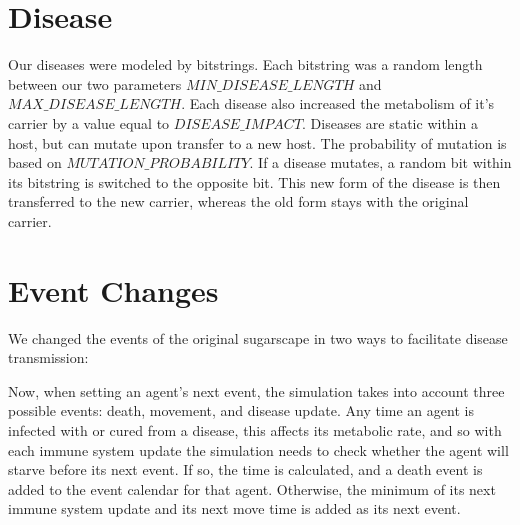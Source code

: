 \documentclass[12pt,a4paper]{article} %
\begin{document}
    \section{Disease}
    Our diseases were modeled by bitstrings. Each bitstring was a random length between our two parameters $MIN\_DISEASE\_LENGTH$ and $MAX\_DISEASE\_LENGTH$. Each disease also increased the metabolism of it's carrier by a value equal to $DISEASE\_IMPACT$. Diseases are static within a host, but can mutate upon transfer to a new host. The probability of mutation is based on $MUTATION\_PROBABILITY$. If a disease mutates, a random bit within its bitstring is switched to the opposite bit. This new form of the disease is then transferred to the new carrier, whereas the old form stays with the original carrier.
    
    \section{Event Changes}
    
    We changed the events of the original sugarscape in two ways to facilitate disease transmission:
    
    
    Now, when setting an agent's next event, the simulation takes into account three possible events: death, movement,
    and disease update. Any time an agent is infected with or cured from a disease, this affects its metabolic rate,
    and so with each immune system update the simulation needs to check whether the agent will starve before its
    next event. If so, the time is calculated, and a death event is added to the event calendar for that agent.
    Otherwise, the minimum of its next immune system update and its next move time is added as its next event.
\end{document}
